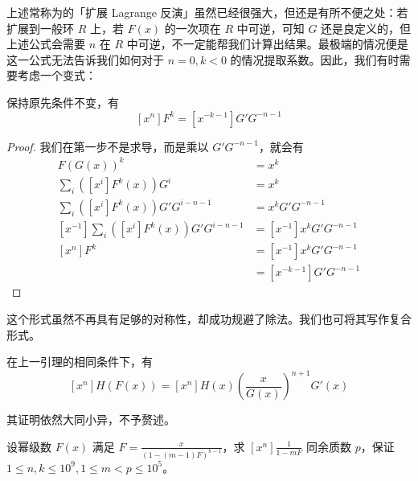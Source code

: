 上述常称为的「扩展 Lagrange 反演」虽然已经很强大，但还是有所不便之处：若扩展到一般环 $R$ 上，若 $F(x)$ 的一次项在 $R$ 中可逆，可知 $G$ 还是良定义的，但上述公式会需要 $n$ 在 $R$ 中可逆，不一定能帮我们计算出结果。最极端的情况便是这一公式无法告诉我们如何对于 $n=0,k<0$ 的情况提取系数。因此，我们有时需要考虑一个变式：

\begin{lemma}[另类 Lagrange 反演]
保持原先条件不变，有
$$
[x^n]F^k = [x^{-k-1}]G'G^{-n-1}
$$
\end{lemma}

\begin{proof} 我们在第一步不是求导，而是乘以 $G'G^{-n-1}$，就会有
\begin{align*}
F(G(x))^k &= x^k\\
\sum_i ([x^i]F^k(x))G^i &= x^k\\
\sum_i ([x^i]F^k(x))G'G^{i-n-1} &= x^k G'G^{-n-1}\\
[x^{-1}]\sum_i ([x^i]F^k(x))G'G^{i-n-1} &= [x^{-1}]x^k G'G^{-n-1}\\
[x^n]F^k &= [x^{-1}]x^k G'G^{-n-1}\\
&= [x^{-k-1}]G'G^{-n-1}
\end{align*}
\end{proof}

这个形式虽然不再具有足够的对称性，却成功规避了除法。我们也可将其写作复合形式。

\begin{lemma} 在上一引理的相同条件下，有
$$
[x^n] H(F(x)) = [x^n]H(x)\left(\frac{x}{G(x)}\right)^{n+1}G'(x)
$$
\end{lemma}

其证明依然大同小异，不予赘述。

\begin{problem}
设幂级数 $F(x)$ 满足 $F = \frac x{(1-(m-1)F)^{k-1}}$，求 $[x^n]\frac 1{1-mF}$ 同余质数 $p$，保证 $1\le n,k\le 10^9, 1\le m < p\le 10^5$。
\end{problem}

